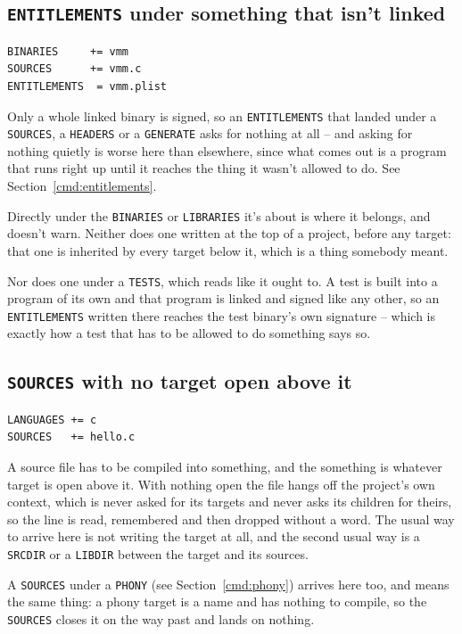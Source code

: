 \documentclass{article}
\begin{document}
\subsection{\texttt{ENTITLEMENTS} under something that isn't linked}

\begin{verbatim}
BINARIES     += vmm
SOURCES      += vmm.c
ENTITLEMENTS  = vmm.plist
\end{verbatim}

Only a whole linked binary is signed, so an \texttt{ENTITLEMENTS} that
landed under a \texttt{SOURCES}, a \texttt{HEADERS} or a
\texttt{GENERATE} asks for nothing at all -- and asking for nothing
quietly is worse here than elsewhere, since what comes out is a
program that runs right up until it reaches the thing it wasn't
allowed to do.  See Section~\ref{cmd:entitlements}.

Directly under the \texttt{BINARIES} or \texttt{LIBRARIES} it's about
is where it belongs, and doesn't warn.  Neither does one written at
the top of a project, before any target: that one is inherited by
every target below it, which is a thing somebody meant.

Nor does one under a \texttt{TESTS}, which reads like it ought to.  A
test is built into a program of its own and that program is linked and
signed like any other, so an \texttt{ENTITLEMENTS} written there
reaches the test binary's own signature -- which is exactly how a test
that has to be allowed to do something says so.

\subsection{\texttt{SOURCES} with no target open above it \label{warn:sources-orphan}}

\begin{verbatim}
LANGUAGES += c
SOURCES   += hello.c
\end{verbatim}

A source file has to be compiled into something, and the something is
whatever target is open above it.  With nothing open the file hangs
off the project's own context, which is never asked for its targets
and never asks its children for theirs, so the line is read,
remembered and then dropped without a word.  The usual way to arrive
here is not writing the target at all, and the second usual way is a
\texttt{SRCDIR} or a \texttt{LIBDIR} between the target and its
sources.

A \texttt{SOURCES} under a \texttt{PHONY} (see
Section~\ref{cmd:phony}) arrives here too, and means the same thing: a
phony target is a name and has nothing to compile, so the
\texttt{SOURCES} closes it on the way past and lands on nothing.
\end{document}

